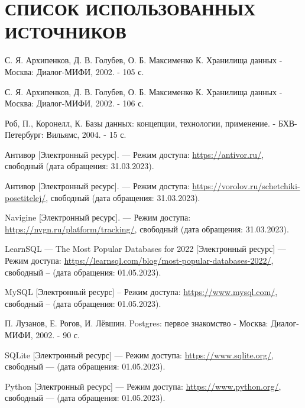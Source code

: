 \section*{СПИСОК ИСПОЛЬЗОВАННЫХ ИСТОЧНИКОВ}
\begingroup
\renewcommand{\section}[2]{}
\begin{thebibliography}{}

    С. Я. Архипенков, Д. В. Голубев, О. Б. Максименко К. Хранилища данных -
    Москва: Диалог-МИФИ, 2002. - 105 с.

    С. Я. Архипенков, Д. В. Голубев, О. Б. Максименко К. Хранилища данных -
    Москва: Диалог-МИФИ, 2002. - 106 с.

    Роб, П., Коронелл, К. Базы данных: концепции, технологии, применение. -
    БХВ-Петербург: Вильямс, 2004. - 15 с.

    Антивор [Электронный ресурс]. --- Режим доступа: \url{https://antivor.ru/},
    свободный (дата обращения: 31.03.2023).

    Антивор [Электронный ресурс]. --- Режим доступа:
    \url{https://vorolov.ru/schetchiki-posetitelej/}, свободный (дата
    обращения:
    31.03.2023).

    Navigine [Электронный ресурс]. --- Режим доступа:
    \url{https://nvgn.ru/platform/tracking/}, свободный (дата обращения:
    31.03.2023).

    LearnSQL --- The Most Popular Databases for 2022 [Электронный ресурс]
    --- Режим доступа:
    \url{https://learnsql.com/blog/most-popular-databases-2022/}, свободный --
    (дата обращения: 01.05.2023).

    MySQL [Электронный ресурс] -- Режим доступа: \url{https://www.mysql.com/},
    свободный -- (дата обращения: 01.05.2023).

    П. Лузанов, Е. Рогов, И. Лёвшин. Postgres: первое знакомство -
    Москва: Диалог-МИФИ, 2002. - 90 с.


    SQLite [Электронный ресурс] --- Режим доступа:
    \url{https://www.sqlite.org/}, свободный --- (дата обращения: 01.05.2023).

    Python [Электронный ресурс] --- Режим доступа:
    \url{https://www.python.org/}, свободный --- (дата обращения: 01.05.2023).


\end{thebibliography}
